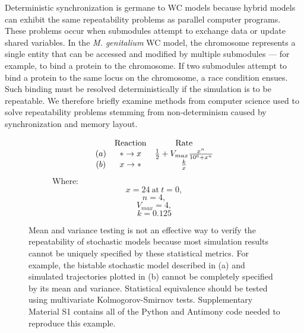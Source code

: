 \documentclass[journal,transmag,twoside]{IEEEtran}
\begin{document}
Deterministic synchronization is germane to WC models because hybrid models can exhibit the same repeatability problems as parallel computer programs. These problems occur when submodules attempt to exchange data or update shared variables. In the \textit{M. genitalium} WC model, the chromosome represents a single entity that can be accessed and modified by multiple submodules --- for example, to bind a protein to the chromosome. If two submodules attempt to bind a protein to the same locus on the chromosome, a race condition ensues. Such binding must be resolved deterministically if the simulation is to be repeatable. %
We therefore briefly examine methods from computer science used to solve repeatability problems stemming from non-determinism caused by synchronization and memory layout.

\begin{figure}
  \centering
  \begin{subfigure}[b]{0.5\textwidth}
    \centering
    \[
    \begin{array}{c c c}
       & \textrm{Reaction} & \textrm{Rate} \\
      \left( a \right) & * \to x & \frac{1}{2} + V_{max} \frac{x^n}{10^6 + x^n} \\
      \left( b \right) & x \to * & \frac{k}{x} \\
    \end{array}
    \]
    Where:
    \[
      x = 24 ~ \textrm{at} ~ t = 0,
    \]
    \[
      n = 4,
    \]
    \[
      V_{max} = 4,
    \]
    \[
      k = 0.125
    \]
    \vspace{3em}
  \end{subfigure}%
  \begin{subfigure}[b]{0.5\textwidth}
    \centering
    
  \end{subfigure}
  \caption{Mean and variance testing is not an effective way to verify the repeatability of stochastic models because most simulation results cannot be uniquely specified by these statistical metrics. For example, the bistable stochastic model described in (a) and simulated trajectories plotted in (b) cannot be completely specified by its mean and variance. Statistical equivalence should be tested using multivariate Kolmogorov-Smirnov tests. Supplementary Material S1 contains all of the Python and Antimony \cite{smith2009antimony} code needed to reproduce this example.}
  \label{fig_bistable_plot}
\end{figure}
\end{document}
